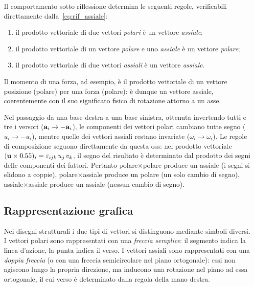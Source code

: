 Il comportamento sotto riflessione determina le seguenti regole,
verificabili direttamente dalla~\eqref{eq:rif_assiale}:
\begin{enumerate}[label=(\roman*)]
	\item il prodotto vettoriale di due vettori \textit{polari} è un
	vettore \textit{assiale};
	\item il prodotto vettoriale di un vettore \textit{polare} e uno
	\textit{assiale} è un vettore \textit{polare};
	\item il prodotto vettoriale di due vettori \textit{assiali} è un
	vettore \textit{assiale}.
\end{enumerate}
Il momento di una forza, ad esempio, è il prodotto vettoriale di un
vettore posizione (polare) per una forza (polare): è dunque un vettore
assiale, coerentemente con il suo significato fisico di rotazione
attorno a un asse.

\begin{oss}
	Nel passaggio da una base destra a una base sinistra, ottenuta	invertendo tutti e tre i versori ($\mathbf{a}_i \to -\mathbf{a}_i$), le
	componenti dei vettori polari cambiano tutte segno	($u_i \to -u_i$), mentre quelle dei vettori assiali restano
	invariate ($\omega_i \to \omega_i$). Le regole di composizione	seguono direttamente da questa oss: nel prodotto
	vettoriale $(\mathbf{u} \times 0.55)_i = \varepsilon_{ijk}\,u_j\,v_k$,	il segno del risultato è determinato dal prodotto dei segni delle
	componenti dei fattori. Pertanto polare$\times$polare produce un	assiale (i segni si elidono a coppie), polare$\times$assiale
	produce un polare (un solo cambio di segno), assiale$\times$assiale	produce un assiale (nessun cambio di segno).
\end{oss}

\subsection{Rappresentazione grafica}

Nei disegni strutturali i due tipi di vettori si distinguono mediante
simboli diversi. I vettori polari sono rappresentati con una
\textit{freccia semplice}: il segmento indica la linea d'azione, la
punta indica il verso. I vettori assiali sono rappresentati con una
\textit{doppia freccia} (o con una freccia semicircolare nel piano
ortogonale): essi non agiscono lungo la propria direzione, ma inducono
una rotazione nel piano ad essa ortogonale, il cui verso è determinato
dalla regola della mano destra.

